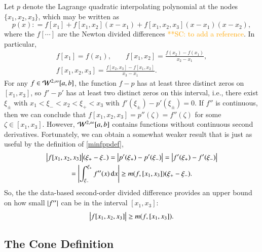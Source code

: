 \documentclass[review]{elsarticle}
\newcommand{\scnote}[1]{ {\textcolor{orange}  {\mbox{**SC:} #1}}}
\begin{document}
Let $p$ denote the Lagrange quadratic interpolating polynomial at the nodes
$\{x_1, x_2, x_3\}$, which may be written as
\begin{equation*}
p(x) : = f[x_1] + f[x_1, x_2](x-x_1) + f[x_1, x_2, x_3](x-x_1)(x-x_2), 
\end{equation*}
where the $f[\cdots]$ are the Newton divided differences \cite{}\scnote{to add a reference}. In particular,
\begin{gather} 
\nonumber
f[x_1] = f(x_1), \qquad f[x_1, x_2] = \frac{f(x_2) - f(x_1)}{x_2-x_1}, \\
f[x_1, x_2,x_3] = \frac{f[x_2,x_3] - f[x_1,x_2]}{x_3-x_1}. \label{divdiff}
\end{gather}
For any $f \in
\mathcal{W}^{2,\infty}[a,b]$, the function $f - p$ has at least three distinct zeros on
$[x_1, x_3]$, so $f' - p'$ has at least two distinct zeros on this interval,
i.e., there exist $\xi_\pm$ with $x_1 < \xi_- < x_2 < \xi_+ < x_3$ with
$f'(\xi_\pm) - p'(\xi_{\pm}) = 0$. If $f''$ is continuous, then we can conclude
that $ f[x_1, x_2, x_3]= p''(\zeta) =f''(\zeta) $ for some $\zeta \in [x_1,
x_3]$. However, $\mathcal{W}^{2,\infty}[a,b]$ contains functions without continuous
second derivatives. Fortunately, we can obtain a somewhat weaker result that is
just as useful by the definition of \eqref{minfppdef},
\begin{multline*}
\bigl \lvert f[x_1, x_2, x_3] \bigr \rvert(\xi_+  - \xi_-) = \left \lvert p'(\xi_+) - p'(\xi_-) \right \rvert =  \left \lvert f'(\xi_+) - f'(\xi_-) \right \rvert \\
= \left \lvert \int_{\xi_-}^{\xi_+} f''(x) \, {\rm d} x \right \rvert \ge m(f,[x_1, x_3]) (\xi_+  - \xi_-).
\end{multline*}
So, the the data-based second-order divided difference provides an upper
bound on how small $\left \lvert f'' \right \rvert$ can be in the interval $[x_1, x_3]$:
\begin{equation}
\bigl \lvert f[x_1, x_2, x_3] \bigr \rvert \ge m(f,[x_1, x_3]).
\end{equation}

\subsection{The Cone Definition}  \label{sec:conedef}
\end{document}
